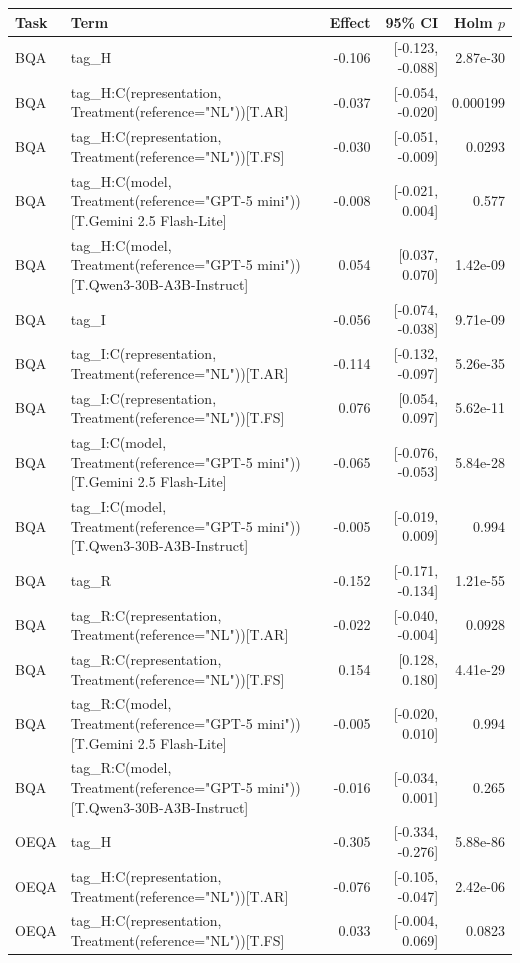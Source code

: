 \begin{tabular}{llrrr}
\toprule
Task & Term & Effect & 95\% CI & Holm $p$ \\
\midrule
BQA & tag\_H & -0.106 & [-0.123, -0.088] & 2.87e-30 \\
BQA & tag\_H:C(representation, Treatment(reference="NL"))[T.AR] & -0.037 & [-0.054, -0.020] & 0.000199 \\
BQA & tag\_H:C(representation, Treatment(reference="NL"))[T.FS] & -0.030 & [-0.051, -0.009] & 0.0293 \\
BQA & tag\_H:C(model, Treatment(reference="GPT-5 mini"))[T.Gemini 2.5 Flash-Lite] & -0.008 & [-0.021, 0.004] & 0.577 \\
BQA & tag\_H:C(model, Treatment(reference="GPT-5 mini"))[T.Qwen3-30B-A3B-Instruct] & 0.054 & [0.037, 0.070] & 1.42e-09 \\
BQA & tag\_I & -0.056 & [-0.074, -0.038] & 9.71e-09 \\
BQA & tag\_I:C(representation, Treatment(reference="NL"))[T.AR] & -0.114 & [-0.132, -0.097] & 5.26e-35 \\
BQA & tag\_I:C(representation, Treatment(reference="NL"))[T.FS] & 0.076 & [0.054, 0.097] & 5.62e-11 \\
BQA & tag\_I:C(model, Treatment(reference="GPT-5 mini"))[T.Gemini 2.5 Flash-Lite] & -0.065 & [-0.076, -0.053] & 5.84e-28 \\
BQA & tag\_I:C(model, Treatment(reference="GPT-5 mini"))[T.Qwen3-30B-A3B-Instruct] & -0.005 & [-0.019, 0.009] & 0.994 \\
BQA & tag\_R & -0.152 & [-0.171, -0.134] & 1.21e-55 \\
BQA & tag\_R:C(representation, Treatment(reference="NL"))[T.AR] & -0.022 & [-0.040, -0.004] & 0.0928 \\
BQA & tag\_R:C(representation, Treatment(reference="NL"))[T.FS] & 0.154 & [0.128, 0.180] & 4.41e-29 \\
BQA & tag\_R:C(model, Treatment(reference="GPT-5 mini"))[T.Gemini 2.5 Flash-Lite] & -0.005 & [-0.020, 0.010] & 0.994 \\
BQA & tag\_R:C(model, Treatment(reference="GPT-5 mini"))[T.Qwen3-30B-A3B-Instruct] & -0.016 & [-0.034, 0.001] & 0.265 \\
OEQA & tag\_H & -0.305 & [-0.334, -0.276] & 5.88e-86 \\
OEQA & tag\_H:C(representation, Treatment(reference="NL"))[T.AR] & -0.076 & [-0.105, -0.047] & 2.42e-06 \\
OEQA & tag\_H:C(representation, Treatment(reference="NL"))[T.FS] & 0.033 & [-0.004, 0.069] & 0.0823 \\

\end{tabular}
